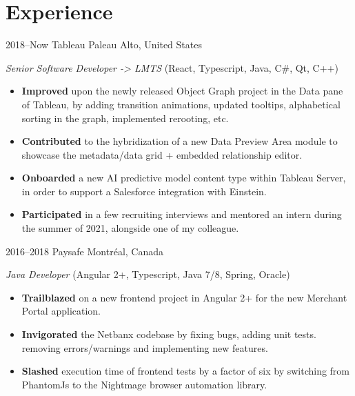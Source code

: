 \documentclass[]{friggeri-cv}
\begin{document}
\section{Experience}
\begin{entrylist}

\entry
{2018--Now}
{Tableau}
{Paleau Alto, United States}
{\emph{Senior Software Developer -> LMTS} (React, Typescript, Java, C#, Qt, C++)
\begin{itemize}
	\item \textbf{Improved} upon the newly released Object Graph project in the Data pane of Tableau, by adding transition animations, updated tooltips, alphabetical sorting in the graph, implemented rerooting, etc.
	\item \textbf{Contributed} to the hybridization of a new Data Preview Area module to showcase the metadata/data grid + embedded relationship editor. 
	\item \textbf{Onboarded} a new AI predictive model content type within Tableau Server, in order to support a Salesforce integration with Einstein.
	\item \textbf{Participated} in a few recruiting interviews and mentored an intern during the summer of 2021, alongside one of my colleague.
\end{itemize}
}


\entry
{2016--2018}
{Paysafe}
{Montréal, Canada}
{\emph{Java Developer} (Angular 2+, Typescript, Java 7/8, Spring, Oracle)
\begin{itemize}
	\item \textbf{Trailblazed} on a new frontend project in Angular 2+ for the new Merchant Portal application.
	\item \textbf{Invigorated} the Netbanx codebase by fixing bugs, adding unit tests. removing errors/warnings and implementing new features.
	\item \textbf{Slashed} execution time of frontend tests by a factor of six by switching from PhantomJs to the Nightmage browser automation library.
\end{itemize}
}



\end{entrylist}
\end{document}
